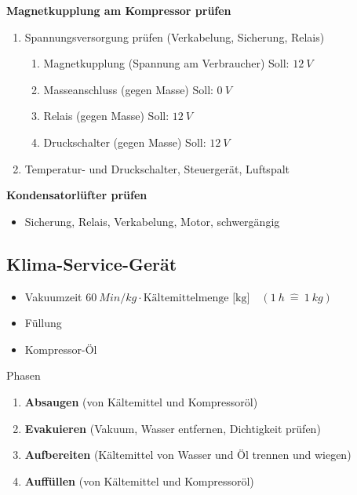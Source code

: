 \textbf{Magnetkupplung am Kompressor prüfen}

\begin{enumerate}
\item
  Spannungsversorgung prüfen (Verkabelung, Sicherung, Relais)

  \begin{enumerate}
  \def\labelenumii{\arabic{enumii}.}
  \item
    Magnetkupplung (Spannung am Verbraucher) Soll: $12~V$
  \item
    Masseanschluss (gegen Masse) Soll: $0~V$
  \item
    Relais (gegen Masse) Soll: $12~V$
  \item
    Druckschalter (gegen Masse) Soll: $12~V$
  \end{enumerate}
\item
  Temperatur- und Druckschalter, Steuergerät, Luftspalt
\end{enumerate}

\textbf{Kondensatorlüfter prüfen}

\begin{itemize}
\item
  Sicherung, Relais, Verkabelung, Motor, schwergängig
\end{itemize}

\subsection{Klima-Service-Gerät}\label{klima-service-geraet}

\begin{itemize}
\item
  Vakuumzeit
  $\boxed{60~Min/kg \cdot \text{Kältemittelmenge [kg]}} \quad (1~h~\hat =~ 1~kg)$
\item
  Füllung
\item
  Kompressor-Öl
\end{itemize}

Phasen

\begin{enumerate}
\item
  \textbf{Absaugen} (von Kältemittel und Kompressoröl)
\item
  \textbf{Evakuieren} (Vakuum, Wasser entfernen, Dichtigkeit prüfen)
\item
  \textbf{Aufbereiten} (Kältemittel von Wasser und Öl trennen und
  wiegen)
\item
  \textbf{Auffüllen} (von Kältemittel und Kompressoröl)
\end{enumerate}
